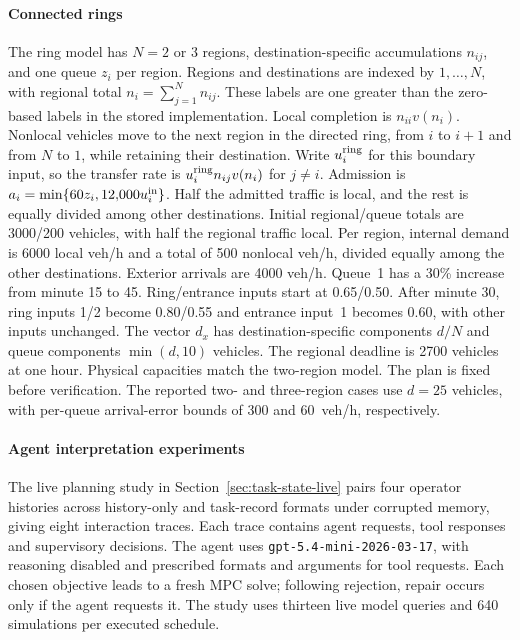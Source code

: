 \documentclass[final]{cas-sc}
\theoremstyle{definition}
\theoremstyle{plain}
\theoremstyle{definition}
\theoremstyle{plain}
\begin{document}
\paragraph{Connected rings}
\label{app:network-transfer}
The ring model has $N=2$ or $3$ regions, destination-specific
accumulations $n_{ij}$, and one queue $z_i$ per region. Regions and
destinations are indexed by $1,\ldots,N$, with regional total
$n_i=\sum_{j=1}^N n_{ij}$. These labels are one greater than the
zero-based labels in the stored implementation. Local completion is
$n_{ii}v(n_i)$. Nonlocal vehicles move to the next region in the directed
ring, from $i$ to $i+1$ and from $N$ to $1$, while retaining their
destination. Write $u_i^{\rm ring}$ for this boundary input, so the
transfer rate is $u_i^{\rm ring}n_{ij}v(n_i)$ for $j\ne i$.
Admission is $a_i=\min\{60z_i,12{,}000u_i^{\rm in}\}$.
Half the admitted traffic is local, and the rest is equally divided
among other destinations. Initial regional/queue totals are 3000/200
vehicles, with half the regional traffic local. Per region, internal
demand is 6000 local veh/h and a total of 500 nonlocal veh/h, divided
equally among the other destinations. Exterior arrivals are
4000 veh/h. Queue~1 has a 30\% increase from minute 15 to 45.
Ring/entrance inputs start at 0.65/0.50. After minute 30, ring inputs
1/2 become 0.80/0.55 and entrance input~1 becomes 0.60, with other
inputs unchanged. The vector $d_x$ has destination-specific components
$d/N$ and queue components $\min(d,10)$ vehicles. The regional deadline
is 2700 vehicles at one hour. Physical capacities match the two-region
model. The plan is fixed before verification. The reported two- and
three-region cases use $d=25$ vehicles, with per-queue arrival-error
bounds of 300 and 60~veh/h, respectively.

\paragraph{Agent interpretation experiments}
\label{app:agent-evaluation}
\label{sec:supp-execution}
\label{sec:queue-live-pilot}
\label{sec:primary-memory-pressure}
The live planning study in Section~\ref{sec:task-state-live} pairs four
operator histories across history-only and task-record formats under
corrupted memory, giving eight interaction traces. Each trace contains
agent requests, tool responses and supervisory decisions. The agent uses
\texttt{gpt-5.4-mini-2026-03-17}, with reasoning disabled and prescribed
formats and arguments for tool requests. Each chosen objective leads to
a fresh MPC solve; following rejection, repair occurs only if the agent
requests it. The study uses thirteen live model queries and 640
simulations per executed schedule.
\end{document}
